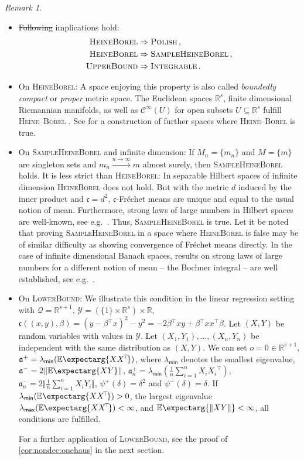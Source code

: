 \documentclass{scrartcl}
\renewcommand{\subset}{\subseteq}
\newcommand{\Ex}{\E\expectarg}
\newcommand*{\mc}[1]{\mathcal{#1}}
\newcommand*{\ms}[1]{\mathsf{#1}}
\newcommand*{\mf}[1]{\mathfrak{#1}}
\newcommand{\R}{\mathbb{R}}
\newcommand{\transpose}{\!^\top\!}
\newcommand{\tr}{\transpose}
\newcommand{\normof}[1]{\Vert #1 \Vert}
\newcommand{\equationFullstop}{\, .}
\newcommand{\eqfs}{\equationFullstop}
\newcommand{\equationComma}{\, ,}
\newcommand{\eqcm}{\equationComma}
\theoremstyle{plain}\newtheorem{theorem}{Theorem}[section]
\theoremstyle{definition}
\theoremstyle{remark}
\newtheorem{remark}[theorem]{Remark}
\providecommand{\DIFaddtex}[1]{{\protect\color{blue}\uwave{#1}}} %
\providecommand{\DIFdeltex}[1]{{\protect\color{red}\sout{#1}}}                      %
\providecommand{\DIFaddbegin}{} %
\providecommand{\DIFaddend}{} %
\providecommand{\DIFdelbegin}{} %
\providecommand{\DIFdelend}{} %
\providecommand{\DIFadd}[1]{\texorpdfstring{\DIFaddtex{#1}}{#1}} %
\providecommand{\DIFdel}[1]{\texorpdfstring{\DIFdeltex{#1}}{}} %
\newcommand{\DIFscaledelfig}{0.5}
\newlength{\DIFdelgraphicswidth} %
\newlength{\DIFdelgraphicsheight} %
\newcommand{\DIFaddincludegraphics}[2][]{{\color{blue}\fbox{\DIFOincludegraphics[#1]{#2}}}} %
\newcommand{\DIFdelincludegraphics}[2][]{%
\sbox{\DIFdelgraphicsbox}{\DIFOincludegraphics[#1]{#2}}%
\settoboxwidth{\DIFdelgraphicswidth}{\DIFdelgraphicsbox} %
\settoboxtotalheight{\DIFdelgraphicsheight}{\DIFdelgraphicsbox} %
\scalebox{\DIFscaledelfig}{%
\parbox[b]{\DIFdelgraphicswidth}{\usebox{\DIFdelgraphicsbox}\\[-\baselineskip] \rule{\DIFdelgraphicswidth}{0em}}\llap{\resizebox{\DIFdelgraphicswidth}{\DIFdelgraphicsheight}{%
\setlength{\unitlength}{\DIFdelgraphicswidth}%
\begin{picture}(1,1)%
\thicklines\linethickness{2pt} %
{\color[rgb]{1,0,0}\put(0,0){\framebox(1,1){}}}%
{\color[rgb]{1,0,0}\put(0,0){\line( 1,1){1}}}%
{\color[rgb]{1,0,0}\put(0,1){\line(1,-1){1}}}%
\end{picture}%
}\hspace*{3pt}}} %
} %
\DeclareRobustCommand{\DIFaddbegin}{\DIFOaddbegin \let\includegraphics\DIFaddincludegraphics} %
\DeclareRobustCommand{\DIFaddend}{\DIFOaddend \let\includegraphics\DIFOincludegraphics} %
\DeclareRobustCommand{\DIFdelbegin}{\DIFOdelbegin \let\includegraphics\DIFdelincludegraphics} %
\DeclareRobustCommand{\DIFdelend}{\DIFOaddend \let\includegraphics\DIFOincludegraphics} %
\begin{document}
\begin{remark}\label{rem:on_ass1}\mbox{ }
\begin{itemize}
\item 
	\DIFdelbegin \DIFdel{Following }\DIFdelend \DIFaddbegin \DIFadd{The following }\DIFaddend implications hold:
	\begin{align*}
	\textsc{HeineBorel} &\Rightarrow \textsc{Polish}\eqcm\\
	\textsc{HeineBorel} &\Rightarrow \textsc{SampleHeineBorel}\eqcm\\
	\textsc{UpperBound} &\Rightarrow \textsc{Integrable}\eqfs
	\end{align*}
\item On \textsc{HeineBorel}:
	A space enjoying this property is also called \textit{boundedly compact} or \textit{proper} metric space.
	The Euclidean spaces $\R^s$, finite dimensional Riemannian manifolds, as well as $\mc C^\infty(U)$ for open subsets $U \subset \R^s$  fulfill \textsc{Heine--Borel} \cite[section 8.4.7]{edwards95}.
	See \cite{williamson87} for a construction of further spaces where \textsc{Heine--Borel} is true. 
\item On \textsc{SampleHeineBorel} and infinite dimension:
	If $M_n=\{m_n\}$ and $M=\{m\}$ are singleton sets and $m_n \xrightarrow{n\to\infty} m$ almost surely, then \textsc{SampleHeineBorel} holds. It is less strict than \textsc{HeineBorel}: In separable Hilbert spaces of infinite dimension \textsc{HeineBorel} does not hold. But with the metric $d$ induced by the inner product and $\mf c=d^2$, $\mf c$-Fréchet means are unique and equal to the usual notion of mean. Furthermore, strong laws of large numbers in Hilbert spaces are well-known, see e.g.\ \cite{kawabe86}. Thus, \textsc{SampleHeineBorel} is true. Let it be noted that proving \textsc{SampleHeineBorel} in a space where \textsc{HeineBorel} is false may be of similar difficulty as showing convergence of Fréchet means directly. In the case of infinite dimensional Banach spaces, results on strong laws of large numbers for a different notion of mean -- the Bochner integral -- are well established, see e.g.\ \cite{hoffmann76}.
\item On \textsc{LowerBound}:
	We illustrate this condition in the linear regression setting with $\mc Q = \R^{s+1}$, $\mc Y = (\{1\}\times\R^s) \times \R$, $\mf c((x,y),\beta) = (y - \beta\tr x)^2 - y^2 = - 2 \beta\tr x y + \beta\tr xx\tr \beta$. Let $(X, Y)$ be random variables with values in $\mc Y$. Let $(X_1, Y_1),\dots, (X_n, Y_n)$ be independent with the same distribution as $(X,Y)$. We can set $o = 0\in\R^{s+1}$, $\mf a^+ = \lambda_{\ms{min}}(\Ex{XX\tr})$, where $\lambda_{\ms{min}}$ denotes the smallest eigenvalue, $\mf a^- = 2 \normof{\Ex{XY}}$, $\mf a^+_n = \lambda_{\ms{min}}(\frac{1}n \sum_{i=1}^n X_iX_i\tr)$, $\mf a^-_n = 2 \normof{\frac{1}n\sum_{i=1}^n X_iY_i}$, $\psi^+(\delta) = \delta^2$ and $\psi^-(\delta) = \delta$. If $\lambda_{\ms{min}}(\Ex{XX\tr}) > 0$, the largest eigenvalue $\lambda_{\ms{max}}(\Ex{XX\tr}) < \infty$, and $\Ex{\normof{XY}} < \infty$, all conditions are fulfilled.

	For a further application of \textsc{LowerBound}, see the proof of \autoref{cor:nondec:onehaus} in the next section.
\end{itemize}
\end{remark}
\end{document}
